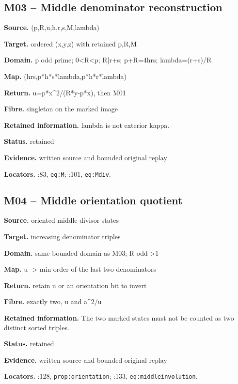 \subsection*{M03 -- Middle denominator reconstruction}
\noindent\textbf{Source.} (p,R,u,h,r,s,M,lambda)\par
\noindent\textbf{Target.} ordered (x,y,z) with retained p,R,M\par
\noindent\textbf{Domain.} p odd prime; 0<R<p; R|r+s; p+R=4hrs; lambda=(r+s)/R\par
\noindent\textbf{Map.} (hrs,p*h*s*lambda,p*h*r*lambda)\par
\noindent\textbf{Return.} u=p*x\textasciicircum{}2/(R*y-p*x), then M01\par
\noindent\textbf{Fibre.} singleton on the marked image\par
\noindent\textbf{Retained information.} lambda is not exterior kappa.\par
\noindent\textbf{Status.} retained\par
\noindent\textbf{Evidence.} written source and bounded original replay\par
\noindent\textbf{Locators.} :83, \texttt{eq:M}; :101, \texttt{eq:Mdiv}.
\subsection*{M04 -- Middle orientation quotient}
\noindent\textbf{Source.} oriented middle divisor states\par
\noindent\textbf{Target.} increasing denominator triples\par
\noindent\textbf{Domain.} same bounded domain as M03; R odd >1\par
\noindent\textbf{Map.} u -> min-order of the last two denominators\par
\noindent\textbf{Return.} retain u or an orientation bit to invert\par
\noindent\textbf{Fibre.} exactly two, u and a\textasciicircum{}2/u\par
\noindent\textbf{Retained information.} The two marked states must not be counted as two distinct sorted triples.\par
\noindent\textbf{Status.} retained\par
\noindent\textbf{Evidence.} written source and bounded original replay\par
\noindent\textbf{Locators.} :128, \texttt{prop:orientation}; :133, \texttt{eq:middleinvolution}.
